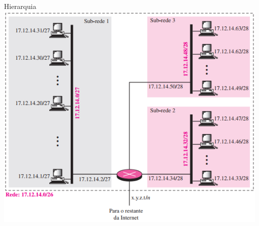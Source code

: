 \documentclass{libs/ufc_format}
\begin{document}
\begin{frame}{Hierarquia}
    \centering
    \includegraphics[scale=0.5]{figuras/figura09_03}
\end{frame}
\end{document}
